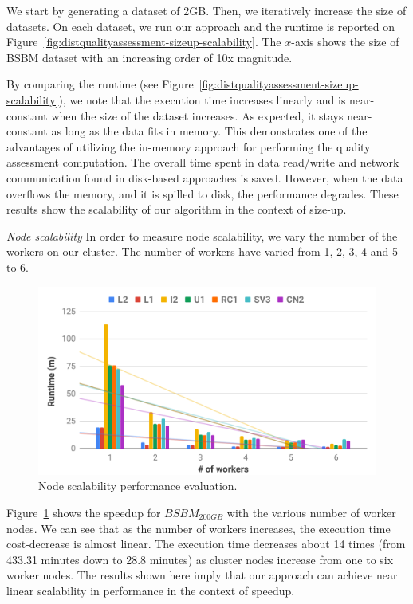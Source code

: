 We start by generating a dataset of 2GB.
Then, we iteratively increase the size of datasets.
On each dataset, we run our approach and the runtime is reported on Figure~\ref{fig:distqualityassessment-sizeup-scalability}.
The $x$-axis shows the size of BSBM dataset with an increasing order of 10x magnitude.

By comparing the runtime (see Figure~\ref{fig:distqualityassessment-sizeup-scalability}), we note that the execution time increases linearly and is near-constant when the size of the dataset increases.
As expected, it stays near-constant as long as the data fits in memory.
This demonstrates one of the advantages of utilizing the in-memory approach for performing the quality assessment computation.
The overall time spent in data read/write and network communication found in disk-based approaches is saved.
However, when the data overflows the memory, and it is spilled to disk, the performance degrades.
These results show the scalability of our algorithm in the context of size-up.

\textit{Node scalability} In order to measure node scalability, we vary the number of the workers on our cluster.
The number of workers have varied from 1, 2, 3, 4 and 5 to 6.

\begin{figure}
\centering
  \includegraphics[width=1.0\columnwidth]{images/5_distqualityassessment/distqualityassessment-node-scalability.pdf}
    \caption{Node scalability performance evaluation.}
    \label{fig:distqualityassessment-node-scalability}
\end{figure}

Figure~\ref{fig:distqualityassessment-node-scalability} shows the speedup for $BSBM_{200GB}$ with the various number of worker nodes.
We can see that as the number of workers increases, the execution time cost-decrease is almost linear.
The execution time decreases about 14 times (from 433.31 minutes down to 28.8 minutes) as cluster nodes increase from one to six worker nodes.
The results shown here imply that our approach can achieve near linear scalability in performance in the context of speedup.

